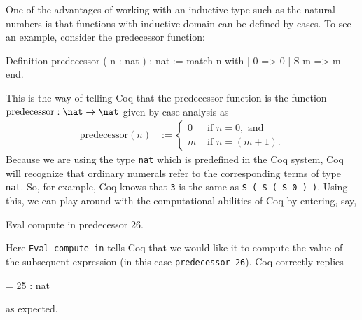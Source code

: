 One of the advantages of working with an inductive type such as the
natural numbers is that functions with inductive domain can be defined
by cases.  To see an example, consider the predecessor function:
\begin{center}
\begin{coqcode}
Definition predecessor ( n : nat ) : nat := 
 match n with
   | 0 => 0
   | S m => m
 end.
\end{coqcode}
\end{center}
This is the way of telling Coq that the predecessor function is the
function $\text{predecessor}:\nat\to\nat$ given by case analysis as
\begin{align*}
  \text{predecessor}(n) & :=
   \begin{cases}
    0 & \text{ if }n=0,\text{ and}\\
    m & \text{ if }n=(m+1).
  \end{cases}
\end{align*}
Because we are using the type \verb|nat| which is predefined in
the Coq system, Coq will recognize that ordinary numerals refer to the
corresponding terms of type \verb|nat|.  So, for example, Coq
knows that \verb|3| is the same as \verb|S ( S ( S 0 ) )|.
Using this, we can play around with the computational abilities of
Coq by entering, say,
\begin{center}
  \begin{coqcode}
Eval compute in predecessor 26.
  \end{coqcode}
\end{center}
Here \verb|Eval compute in| tells Coq that we would like it to
compute the value of the subsequent expression (in this case
\verb|predecessor 26|).  Coq correctly replies
\begin{center}
  \begin{coqcode}
= 25 : nat
  \end{coqcode}
\end{center}
as expected.

